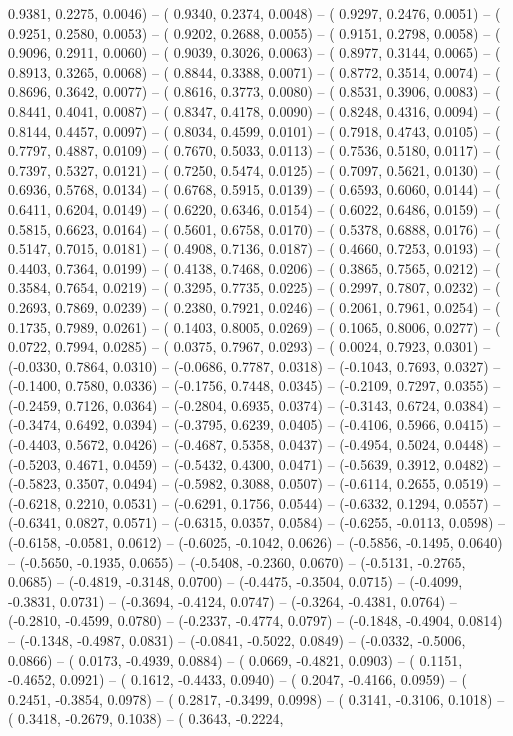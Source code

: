 0.9381,  0.2275,  0.0046) -- ( 0.9340,  0.2374,  0.0048) -- ( 0.9297,  0.2476,  0.0051) -- ( 0.9251,  0.2580,  0.0053) -- ( 0.9202,  0.2688,  0.0055) -- ( 0.9151,  0.2798,  0.0058) -- ( 0.9096,  0.2911,  0.0060) -- ( 0.9039,  0.3026,  0.0063) -- ( 0.8977,  0.3144,  0.0065) -- ( 0.8913,  0.3265,  0.0068) -- ( 0.8844,  0.3388,  0.0071) -- ( 0.8772,  0.3514,  0.0074) -- ( 0.8696,  0.3642,  0.0077) -- ( 0.8616,  0.3773,  0.0080) -- ( 0.8531,  0.3906,  0.0083) -- ( 0.8441,  0.4041,  0.0087) -- ( 0.8347,  0.4178,  0.0090) -- ( 0.8248,  0.4316,  0.0094) -- ( 0.8144,  0.4457,  0.0097) -- ( 0.8034,  0.4599,  0.0101) -- ( 0.7918,  0.4743,  0.0105) -- ( 0.7797,  0.4887,  0.0109) -- ( 0.7670,  0.5033,  0.0113) -- ( 0.7536,  0.5180,  0.0117) -- ( 0.7397,  0.5327,  0.0121) -- ( 0.7250,  0.5474,  0.0125) -- ( 0.7097,  0.5621,  0.0130) -- ( 0.6936,  0.5768,  0.0134) -- ( 0.6768,  0.5915,  0.0139) -- ( 0.6593,  0.6060,  0.0144) -- ( 0.6411,  0.6204,  0.0149) -- ( 0.6220,  0.6346,  0.0154) -- ( 0.6022,  0.6486,  0.0159) -- ( 0.5815,  0.6623,  0.0164) -- ( 0.5601,  0.6758,  0.0170) -- ( 0.5378,  0.6888,  0.0176) -- ( 0.5147,  0.7015,  0.0181) -- ( 0.4908,  0.7136,  0.0187) -- ( 0.4660,  0.7253,  0.0193) -- ( 0.4403,  0.7364,  0.0199) -- ( 0.4138,  0.7468,  0.0206) -- ( 0.3865,  0.7565,  0.0212) -- ( 0.3584,  0.7654,  0.0219) -- ( 0.3295,  0.7735,  0.0225) -- ( 0.2997,  0.7807,  0.0232) -- ( 0.2693,  0.7869,  0.0239) -- ( 0.2380,  0.7921,  0.0246) -- ( 0.2061,  0.7961,  0.0254) -- ( 0.1735,  0.7989,  0.0261) -- ( 0.1403,  0.8005,  0.0269) -- ( 0.1065,  0.8006,  0.0277) -- ( 0.0722,  0.7994,  0.0285) -- ( 0.0375,  0.7967,  0.0293) -- ( 0.0024,  0.7923,  0.0301) -- (-0.0330,  0.7864,  0.0310) -- (-0.0686,  0.7787,  0.0318) -- (-0.1043,  0.7693,  0.0327) -- (-0.1400,  0.7580,  0.0336) -- (-0.1756,  0.7448,  0.0345) -- (-0.2109,  0.7297,  0.0355) -- (-0.2459,  0.7126,  0.0364) -- (-0.2804,  0.6935,  0.0374) -- (-0.3143,  0.6724,  0.0384) -- (-0.3474,  0.6492,  0.0394) -- (-0.3795,  0.6239,  0.0405) -- (-0.4106,  0.5966,  0.0415) -- (-0.4403,  0.5672,  0.0426) -- (-0.4687,  0.5358,  0.0437) -- (-0.4954,  0.5024,  0.0448) -- (-0.5203,  0.4671,  0.0459) -- (-0.5432,  0.4300,  0.0471) -- (-0.5639,  0.3912,  0.0482) -- (-0.5823,  0.3507,  0.0494) -- (-0.5982,  0.3088,  0.0507) -- (-0.6114,  0.2655,  0.0519) -- (-0.6218,  0.2210,  0.0531) -- (-0.6291,  0.1756,  0.0544) -- (-0.6332,  0.1294,  0.0557) -- (-0.6341,  0.0827,  0.0571) -- (-0.6315,  0.0357,  0.0584) -- (-0.6255, -0.0113,  0.0598) -- (-0.6158, -0.0581,  0.0612) -- (-0.6025, -0.1042,  0.0626) -- (-0.5856, -0.1495,  0.0640) -- (-0.5650, -0.1935,  0.0655) -- (-0.5408, -0.2360,  0.0670) -- (-0.5131, -0.2765,  0.0685) -- (-0.4819, -0.3148,  0.0700) -- (-0.4475, -0.3504,  0.0715) -- (-0.4099, -0.3831,  0.0731) -- (-0.3694, -0.4124,  0.0747) -- (-0.3264, -0.4381,  0.0764) -- (-0.2810, -0.4599,  0.0780) -- (-0.2337, -0.4774,  0.0797) -- (-0.1848, -0.4904,  0.0814) -- (-0.1348, -0.4987,  0.0831) -- (-0.0841, -0.5022,  0.0849) -- (-0.0332, -0.5006,  0.0866) -- ( 0.0173, -0.4939,  0.0884) -- ( 0.0669, -0.4821,  0.0903) -- ( 0.1151, -0.4652,  0.0921) -- ( 0.1612, -0.4433,  0.0940) -- ( 0.2047, -0.4166,  0.0959) -- ( 0.2451, -0.3854,  0.0978) -- ( 0.2817, -0.3499,  0.0998) -- ( 0.3141, -0.3106,  0.1018) -- ( 0.3418, -0.2679,  0.1038) -- ( 0.3643, -0.2224,  